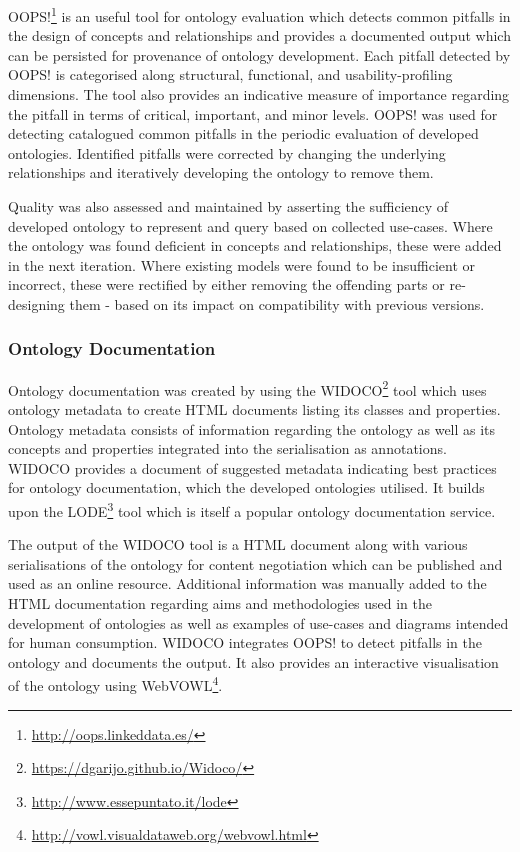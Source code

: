 OOPS!\footnote{\url{http://oops.linkeddata.es/}} \cite{poveda-villalon_oops!_2014} is an useful tool for ontology evaluation which detects common pitfalls in the design of concepts and relationships and provides a documented output which can be persisted for provenance of ontology development. Each pitfall detected by OOPS! is categorised along  structural, functional, and usability-profiling dimensions. The tool also provides an indicative measure of importance regarding the pitfall in terms of critical, important, and minor levels.
OOPS! was used for detecting catalogued common pitfalls in the periodic evaluation of developed ontologies. Identified pitfalls were corrected by changing the underlying relationships and iteratively developing the ontology to remove them. 

Quality was also assessed and maintained by asserting the sufficiency of developed ontology to represent and query based on collected use-cases. Where the ontology was found deficient in concepts and relationships, these were added in the next iteration. Where existing models were found to be insufficient or incorrect, these were rectified by either removing the offending parts or re-designing them - based on its impact on compatibility with previous versions.

\subsubsection*{Ontology Documentation}
Ontology documentation was created by using the WIDOCO\footnote{\url{https://dgarijo.github.io/Widoco/}} \cite{garijo_widoco_2017} tool which uses ontology metadata to create HTML documents listing its classes and properties. Ontology metadata consists of information regarding the ontology as well as its concepts and properties integrated into the serialisation as annotations. WIDOCO provides a document of suggested metadata indicating best practices for ontology documentation, which the developed ontologies utilised. It builds upon the LODE\footnote{\url{http://www.essepuntato.it/lode}} tool which is itself a popular ontology documentation service.

The output of the WIDOCO tool is a HTML document along with various serialisations of the ontology for content negotiation which can be published and used as an online resource. Additional information was manually added to the HTML documentation regarding aims and methodologies used in the development of ontologies as well as examples of use-cases and diagrams intended for human consumption. WIDOCO integrates OOPS! to detect pitfalls in the ontology and documents the output. It also provides an interactive visualisation of the ontology using WebVOWL\footnote{\url{http://vowl.visualdataweb.org/webvowl.html}}.

